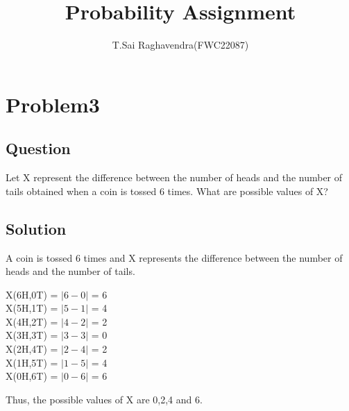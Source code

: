 \documentclass[journal,12pt,twocolumn]{IEEEtran}
\title{\mytitle}
\title{
Probability Assignment
}
\author{T.Sai Raghavendra(FWC22087)}
\begin{document}
\maketitle
\tableofcontents
\bigskip
\section{\textbf{Problem3}}
\subsection{\textbf{Question}}
Let X represent the difference between the number of heads and the number of tails obtained when a coin is tossed 6 times. What are possible values of X?\\
\subsection{\textbf{Solution}}
A coin is tossed 6 times and X represents the difference between the number of heads and the number of tails.\\
\begin{center}
X(6H,0T) = $|6-0|$ = 6\\
X(5H,1T) = $|5-1|$ = 4\\
X(4H,2T) = $|4-2|$ = 2\\
X(3H,3T) = $|3-3|$ = 0\\
X(2H,4T) = $|2-4|$ = 2\\
X(1H,5T) = $|1-5|$ = 4\\
X(0H,6T) = $|0-6|$ = 6\\
\end{center}
Thus, the possible values of X are 0,2,4 and 6.
\end{document}
